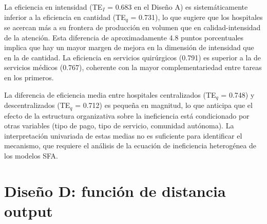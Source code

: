 La eficiencia en intensidad (TE$_I$ = 0.683 en el Diseño A) es sistemáticamente inferior a la eficiencia en cantidad (TE$_q$ = 0.731), lo que sugiere que los hospitales se acercan más a su frontera de producción en volumen que en calidad-intensidad de la atención. Esta diferencia de aproximadamente 4.8 puntos porcentuales implica que hay un mayor margen de mejora en la dimensión de intensidad que en la de cantidad. La eficiencia en servicios quirúrgicos (0.791) es superior a la de servicios médicos (0.767), coherente con la mayor complementariedad entre tareas en los primeros.

La diferencia de eficiencia media entre hospitales centralizados (TE$_q$ = 0.748) y descentralizados (TE$_q$ = 0.712) es pequeña en magnitud, lo que anticipa que el efecto de la estructura organizativa sobre la ineficiencia está condicionado por otras variables (tipo de pago, tipo de servicio, comunidad autónoma). La interpretación univariada de estas medias no es suficiente para identificar el mecanismo, que requiere el análisis de la ecuación de ineficiencia heterogénea de los modelos SFA.


\section{Diseño D: función de distancia output}


